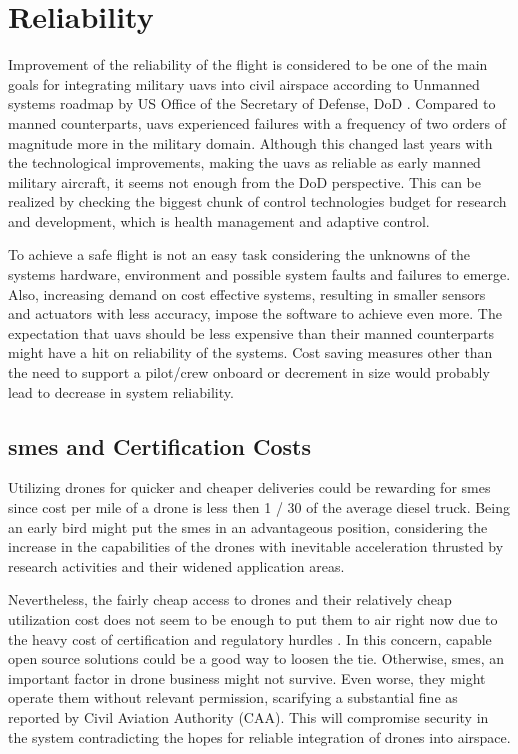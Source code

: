 \section{Reliability}\label{ch2:reliability}

Improvement of the reliability of the flight is considered to be one of the main goals for 
integrating military \gls{uav}s into civil airspace according to Unmanned systems roadmap 
by US Office of the Secretary of Defense, DoD \cite{UnmannedSystemsRoadmapDoD}. 
Compared to manned counterparts, \gls{uav}s experienced failures with a frequency of two 
orders of magnitude more in the military domain.  Although this changed last years with 
the technological improvements, making the \gls{uav}s as reliable as early manned military 
aircraft, it seems not enough from the DoD perspective. This can be realized by checking 
the biggest chunk of control technologies budget for research and development, which is 
health management and adaptive control.

To achieve a safe flight is not an easy task considering the unknowns of the systems hardware, 
environment and possible system faults and failures to emerge. Also, increasing demand on 
cost effective systems, resulting in smaller sensors and actuators with less accuracy, 
impose the software to achieve even more. The expectation that \gls{uav}s should be less 
expensive than their manned counterparts might have a hit on reliability of the systems. 
Cost saving measures other than the need to support a pilot/crew onboard or decrement 
in size would probably lead to decrease in system reliability. 

\subsection{\gls{sme}s and Certification Costs}

Utilizing drones for quicker and cheaper deliveries could be rewarding for \gls{sme}s 
since cost per mile of a drone is less then 1 / 30 of the average diesel truck. Being an 
early bird might put the \gls{sme}s in an advantageous position, considering the increase 
in the capabilities of the drones with inevitable acceleration thrusted by research activities 
and their widened application areas. 

Nevertheless, the fairly cheap access to drones and their relatively cheap utilization cost 
does not seem to be enough to put them to air right now due to the heavy cost of certification 
and regulatory hurdles \cite{UAVreliabilityStudy}. In this concern, capable open source solutions 
could be a good way to loosen the tie.  Otherwise, \gls{sme}s, an important factor in drone 
business might not survive. Even worse, they might operate them without relevant permission, 
scarifying a substantial fine as reported by Civil Aviation Authority (CAA). This will compromise 
security in the system contradicting the hopes for reliable integration of drones into airspace. 

